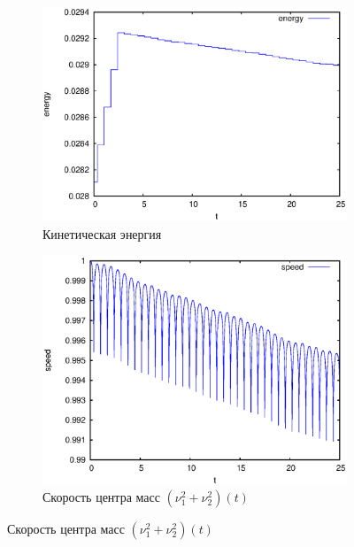 \begin{figure}[H]
    \centering
    \begin{subfigure}[t]{0.45\textwidth}
        \centering
        \includegraphics[width=\linewidth]{pic/rol__straight__kinetic_energy}
        \caption{Кинетическая энергия}
        \label{fig:rol__straight__kinetic_energy}
    \end{subfigure}
    \begin{subfigure}[t]{0.45\textwidth}
        \centering
        \includegraphics[width=\linewidth]{pic/rol__straight__speed_of_center_of_mass}
        \caption{Скорость центра масс $\left(\nu_1^2 + \nu_2^2\right)(t)$}
        \label{fig:rol__straight__speed_of_center_of_mass}
    \end{subfigure}
    \vspace{12pt}
    

\end{figure}
